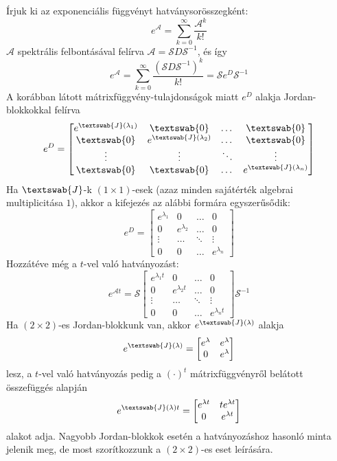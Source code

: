 \documentclass[14p]{article}
\begin{document}
Írjuk ki az exponenciális függvényt hatványsorösszegként:
\[
	e^{\mathcal{A}} = \sum_{k=0}^{\infty}{\frac{\mathcal{A}^k}{k!}}
\]
$\mathcal{A}$ spektrális felbontásával felírva $\mathcal{A} = \mathcal{S}D\mathcal{S}^{-1}$, és így
\[
	e^{\mathcal{A}} = \sum_{k=0}^{\infty}{\frac{(\mathcal{S}D\mathcal{S}^{-1})^k}{k!}} = \mathcal{S}e^{D}\mathcal{S}^{-1}
\]
A korábban látott mátrixfüggvény-tulajdonságok miatt $e^{D}$ alakja Jordan-blokkokkal felírva
\[
		e^D = 
			\begin{bmatrix}
			e^{\textswab{J}(\lambda_1)} & \textswab{0} & \dots & \textswab{0} \\
			\textswab{0} & e^{\textswab{J}(\lambda_2)} & \dots & \textswab{0} \\
			\vdots & \vdots & \ddots & \vdots \\
			\textswab{0} & \textswab{0} & \dots & e^{\textswab{J}(\lambda_n)}
			\end{bmatrix}
\]
Ha $\textswab{J}$-k $(1 \times 1)$-esek (azaz minden sajátérték algebrai multiplicitása $1$), akkor a kifejezés az alábbi formára egyszerűsődik:
\[
	e^D =
	\begin{bmatrix}
	e^{\lambda_1} & 0 & \dots & 0 \\
	0 & e^{\lambda_2} & \dots & 0 \\
	\vdots & \dots  & \ddots & \vdots \\
	0 & 0 & \dots & e^{\lambda_n}
	\end{bmatrix}
\]
Hozzátéve még a $t$-vel való hatványozást:
\[
	e^{\mathcal{A}t} = \mathcal{S}
	\begin{bmatrix}
	e^{\lambda_1 t} & 0 & \dots & 0 \\
	0 & e^{\lambda_2 t} & \dots & 0 \\
	\vdots & \dots  & \ddots & \vdots \\
	0 & 0 & \dots & e^{\lambda_n t}
	\end{bmatrix} \mathcal{S}^{-1}
\]
Ha $(2 \times 2)$-es Jordan-blokkunk van, akkor $e^{\textswab{J}(\lambda)}$ alakja
\[
	e^{\textswab{J}(\lambda)} = 
	\begin{bmatrix}
	e^{\lambda} & e^{\lambda} \\
	0 & e^{\lambda}
	\end{bmatrix}
\]
lesz, a $t$-vel való hatványozás pedig a $(\cdot)^t$ mátrixfüggvényről belátott összefüggés alapján
\[
	e^{\textswab{J}(\lambda)t} = 
		\begin{bmatrix}
		e^{\lambda t} & t e^{\lambda t} \\
		0 & e^{\lambda t}
		\end{bmatrix}
\]
alakot adja. Nagyobb Jordan-blokkok esetén a hatványozáshoz hasonló minta jelenik meg, de most szorítkozzunk a $(2 \times 2)$-es eset leírására.
\end{document}

